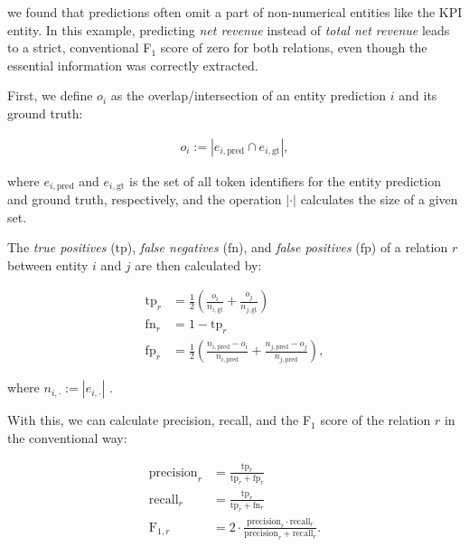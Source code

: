 \documentclass[conference, table]{IEEEtran}
\newcommand{\1} {\mathbbm{1}}
\begin{document}
\noindent we found that predictions often omit a part of non-numerical entities like the KPI entity. In this example, predicting \textit{net revenue} instead of \textit{total net revenue} leads to a strict, conventional F$_1$ score of zero for both relations, even though the essential information was correctly extracted.

First, we define $o_i$ as the overlap/intersection of an entity prediction $i$ and its ground truth:

\begin{align}
    o_i := \left| e_{i, \text{pred}} \cap e_{i, \text{gt}} \right| , \label{eq1}
\end{align}

\noindent where $e_{i, \text{pred}}$ and $e_{i, \text{gt}}$ is the set of all token identifiers for the entity prediction and ground truth, respectively, and the operation $|\cdot|$ calculates the size of a given set.

The \textit{true positives} ($\text{tp}$), \textit{false negatives} ($\text{fn}$), and \textit{false positives} ($\text{fp}$) of a relation $r$ between entity $i$ and $j$ are then calculated by:

\begin{align}
    \text{tp}_r &= \frac{1}{2} \left( \frac{o_i}{n_{i, \text{gt}}} + \frac{o_j}{n_{j, \text{gt}}} \right) \\
    \text{fn}_r &= 1 - \text{tp}_r \\
    \text{fp}_r &= \frac{1}{2} \left( \frac{n_{i, \text{pred}} - o_i}{n_{i, \text{pred}}} +  \frac{n_{j, \text{pred}} - o_j}{n_{j, \text{pred}}} \right), \label{eq4}
\end{align}

\noindent where $n_{i, \cdot} := |e_{i, \cdot}|$ .
\addtocounter{footnote}{+1}
With this, we can calculate precision, recall, and the F$_1$ score of the relation $r$ in the conventional way:

\begin{align}
    \text{precision}_r &= \frac{\text{tp}_r}{\text{tp}_r + \text{fp}_r} \\
    \text{recall}_r &= \frac{\text{tp}_r}{\text{tp}_r + \text{fn}_r} \\
    \text{F}_{1,r} &= 2 \cdot \frac{\text{precision}_r \cdot \text{recall}_r}{\text{precision}_r + \text{recall}_r}.
\end{align}
\end{document}
